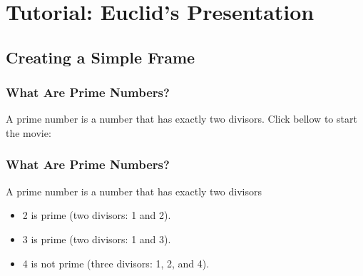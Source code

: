 \section{Tutorial: Euclid's Presentation}
\subsection{Creating a Simple Frame}
\begin{frame}
  \frametitle{What Are Prime Numbers?}
  A prime number is a number that has exactly two divisors.
  Click bellow to start the movie:\\
\end{frame}
\begin{frame}
  \frametitle{What Are Prime Numbers?}
  \begin{definition}
    A \alert{prime number} is a number that has exactly two divisors
  \end{definition}
  \begin{example}
    \begin{itemize}
    \item 2 is prime (two divisors: 1 and 2).
    \item 3 is prime (two divisors: 1 and 3).
    \item 4 is not prime (\alert{three} divisors: 1, 2, and 4).
    \end{itemize}
  \end{example}
\end{frame}
